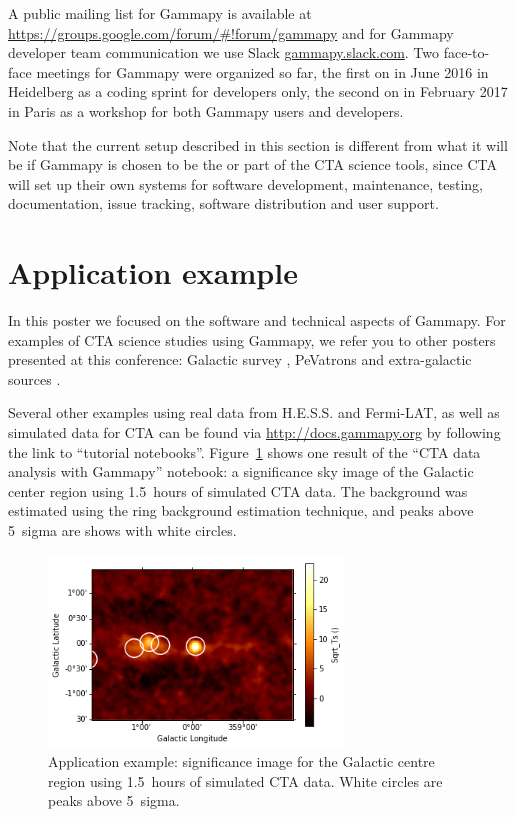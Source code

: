 \documentclass{PoS}
\newcommand{\url}[1]{\href{#1}{#1}}
\begin{document}
A public mailing list for Gammapy is available at
\url{https://groups.google.com/forum/\#!forum/gammapy} and for Gammapy developer
team communication we use Slack \url{gammapy.slack.com}. Two face-to-face
meetings for Gammapy were organized so far, the first on in June 2016 in
Heidelberg as a coding sprint for developers only, the second on in February
2017 in Paris as a workshop for both Gammapy users and developers.

Note that the current setup described in this section is different from what it
will be if Gammapy is chosen to be the or part of the CTA science tools, since
CTA will set up their own systems for software development, maintenance,
testing, documentation, issue tracking, software distribution and user support.

\section{Application example}
\label{sec:application}

In this poster we focused on the software and technical aspects of Gammapy. For
examples of CTA science studies using Gammapy, we refer you to other posters presented at this conference: Galactic survey \cite{roberta}, PeVatrons \cite{cyril} and extra-galactic sources \cite{julien}.

Several other examples using real data from H.E.S.S. and Fermi-LAT, as well as
simulated data for CTA can be found via \url{http://docs.gammapy.org} by
following the link to ``tutorial notebooks''. Figure~\ref{fig:app} shows one
result of the ``CTA data analysis with Gammapy'' notebook: a significance sky
image of the Galactic center region using 1.5~hours of simulated CTA data. The
background was estimated using the ring background estimation technique, and
peaks above 5~sigma are shows with white circles.


\begin{figure}[t]
\centering
\includegraphics[width=0.7\textwidth]{figures/gammapy_example_sky_image.png}
\caption{
Application example: significance image for the Galactic centre region using 1.5~hours of simulated CTA data.  White circles are peaks above 5~sigma.
}
\label{fig:app}
\end{figure}
\end{document}
